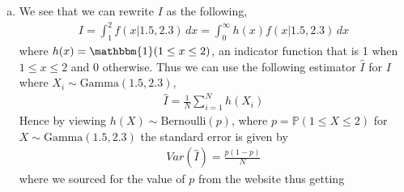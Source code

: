 \documentclass[a4paper,10pt]{article}
\theoremstyle{definition}
\begin{document}
\begin{enumerate}
\begin{enumerate}[(a)]
\begin{lstlisting}[language=R,commentstyle=\fontseries{lc}\color{gray}]
\end{lstlisting}
%
\item 
We see that we can rewrite $I$ as the following,
\begin{align*}
I = \int_{1}^{2}f(x|1.5,2.3)\,dx = \int_{0}^{\infty}h(x)f(x|1.5,2.3)\,dx
\end{align*}
where $h(x) = \mathbbm{1}(1\leq x \leq 2)$, an indicator function that is 1 when $1 \leq x \leq 2$ and 0 otherwise. Thus we can use the following estimator $\hat{I}$ for $I$ where $X_i\sim \text{Gamma}(1.5,2.3)$,
\begin{align*}
\hat{I} = \frac{1}{N}\sum_{i=1}^{N}h(X_i)
\end{align*}
Hence by viewing $h(X)\sim\text{Bernoulli}(p)$, where $p = \mathbb{P}(1\leq X \leq 2)$ for $X\sim \text{Gamma}(1.5,2.3)$ the standard error is given by 
\begin{align*}
Var(\hat{I}) = \frac{p(1-p)}{N}
\end{align*}
where we sourced for the value of $p$ from the website thus getting
\begin{align*}

\end{align*}
\end{enumerate}
\end{enumerate}
\end{document}
